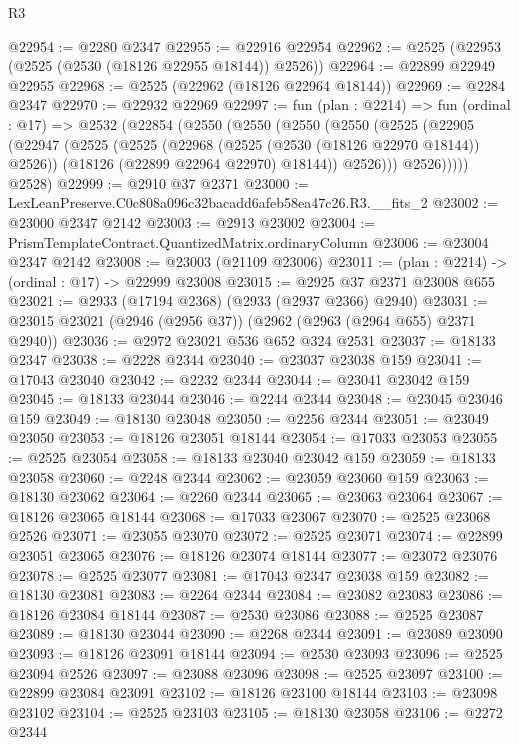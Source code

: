\begin{lexlean}{R3}
\begin{coremodule}
@22954 := @2280 @2347
@22955 := @22916 @22954
@22962 := @2525 (@22953 (@2525 (@2530 (@18126 @22955 @18144)) @2526))
@22964 := @22899 @22949 @22955
@22968 := @2525 (@22962 (@18126 @22964 @18144))
@22969 := @2284 @2347
@22970 := @22932 @22969
@22997 := fun (plan : @2214) =>
  fun (ordinal : @17) =>
  @2532
    (@22854
      (@2550
        (@2550
          (@2550
            (@2550
              (@2525
                (@22905
                  (@22947
                    (@2525
                      (@2525
                        (@22968 (@2525 (@2530 (@18126 @22970 @18144)) @2526))
                        (@18126 (@22899 @22964 @22970) @18144))
                      @2526)))
                @2526)))))
      @2528)
@22999 := @2910 @37 @2371
@23000 := LexLeanPreserve.C0c808a096c32bacadd6afeb58ea47c26.R3.__fits_2
@23002 := @23000 @2347 @2142
@23003 := @2913 @23002
@23004 := PrismTemplateContract.QuantizedMatrix.ordinaryColumn
@23006 := @23004 @2347 @2142
@23008 := @23003 (@21109 @23006)
@23011 := (plan : @2214) -> (ordinal : @17) -> @22999 @23008
@23015 := @2925 @37 @2371 @23008 @655
@23021 := @2933 (@17194 @2368) (@2933 (@2937 @2366) @2940)
@23031 := @23015 @23021 (@2946 (@2956 @37)) (@2962 (@2963 (@2964 @655) @2371 @2940))
@23036 := @2972 @23021 @536 @652 @324 @2531
@23037 := @18133 @2347
@23038 := @2228 @2344
@23040 := @23037 @23038 @159
@23041 := @17043 @23040
@23042 := @2232 @2344
@23044 := @23041 @23042 @159
@23045 := @18133 @23044
@23046 := @2244 @2344
@23048 := @23045 @23046 @159
@23049 := @18130 @23048
@23050 := @2256 @2344
@23051 := @23049 @23050
@23053 := @18126 @23051 @18144
@23054 := @17033 @23053
@23055 := @2525 @23054
@23058 := @18133 @23040 @23042 @159
@23059 := @18133 @23058
@23060 := @2248 @2344
@23062 := @23059 @23060 @159
@23063 := @18130 @23062
@23064 := @2260 @2344
@23065 := @23063 @23064
@23067 := @18126 @23065 @18144
@23068 := @17033 @23067
@23070 := @2525 @23068 @2526
@23071 := @23055 @23070
@23072 := @2525 @23071
@23074 := @22899 @23051 @23065
@23076 := @18126 @23074 @18144
@23077 := @23072 @23076
@23078 := @2525 @23077
@23081 := @17043 @2347 @23038 @159
@23082 := @18130 @23081
@23083 := @2264 @2344
@23084 := @23082 @23083
@23086 := @18126 @23084 @18144
@23087 := @2530 @23086
@23088 := @2525 @23087
@23089 := @18130 @23044
@23090 := @2268 @2344
@23091 := @23089 @23090
@23093 := @18126 @23091 @18144
@23094 := @2530 @23093
@23096 := @2525 @23094 @2526
@23097 := @23088 @23096
@23098 := @2525 @23097
@23100 := @22899 @23084 @23091
@23102 := @18126 @23100 @18144
@23103 := @23098 @23102
@23104 := @2525 @23103
@23105 := @18130 @23058
@23106 := @2272 @2344

\end{coremodule}
\end{lexlean}
